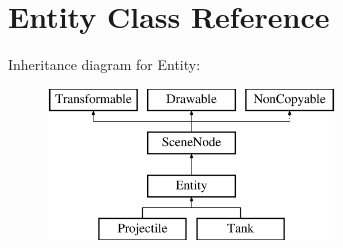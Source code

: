 \hypertarget{class_entity}{}\section{Entity Class Reference}
\label{class_entity}
Inheritance diagram for Entity\+:\begin{figure}[H]
\begin{center}
\leavevmode
\includegraphics[height=4.000000cm]{class_entity}
\end{center}
\end{figure}
